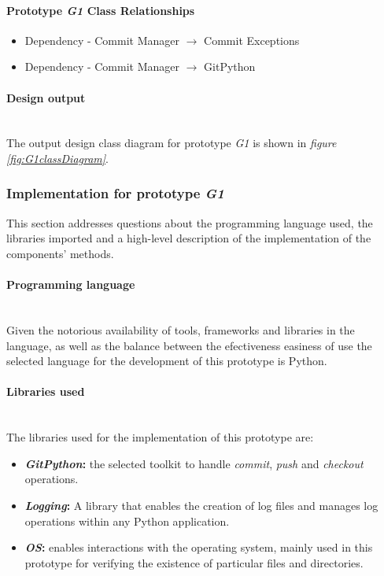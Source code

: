 \paragraph{Prototype \emph{G1} Class Relationships}

\begin{itemize}
    \item Dependency - Commit Manager $\rightarrow$ Commit Exceptions
    \item Dependency - Commit Manager $\rightarrow$ GitPython
\end{itemize}

\paragraph{Design output}\mbox{}\\

The output design class diagram for prototype \emph{G1} is shown in \emph{figure \ref{fig:G1classDiagram}}.

\subsubsection{Implementation for prototype \emph{G1}}

This section addresses questions about the programming language used, the libraries imported and a high-level description of the implementation of the components' methods.

\paragraph{Programming language} \mbox{}\\

Given the notorious availability of tools, frameworks and libraries in the language, as well as the balance between the efectiveness easiness of use the selected language for the development
of this prototype is Python.

\paragraph{Libraries used} \mbox{}\\

The libraries used for the implementation of this prototype are:

\begin{itemize}

    \item \textbf{\emph{GitPython}: }the selected toolkit to handle \emph{commit}, \emph{push} and \emph{checkout} operations.
    \item \textbf{\emph{Logging}: }A library that enables the creation of log files and manages log operations within any Python application.
    \item \textbf{\emph{OS}: }enables interactions with the operating system, mainly used in this prototype for verifying the existence of particular files and directories.

\end{itemize}

